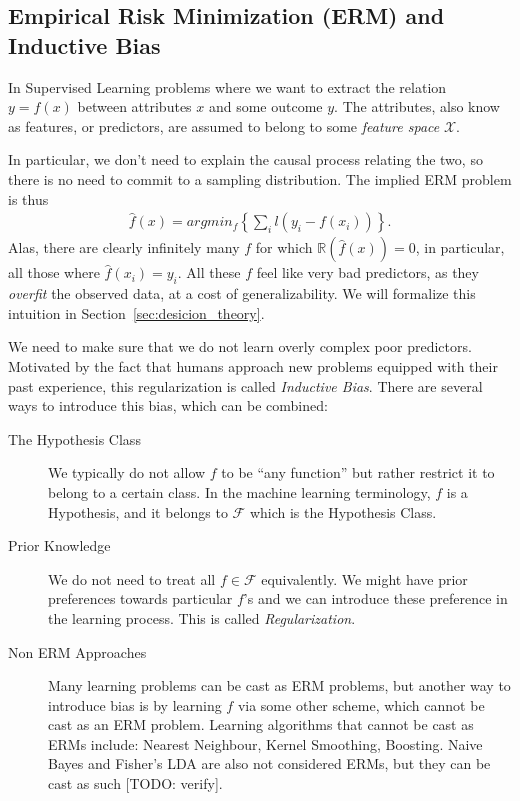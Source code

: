 \documentclass[12pt,a4paper]{article}
\theoremstyle{plain}
\theoremstyle{definition}
\newcommand{\loss}{l}
\newcommand{\riskn}{\mathbb{R}}
\newcommand{\argmin}[2]{argmin_{#1}\left\{ #2 \right\}}
\newcommand{\hyp}{f}
\newcommand{\hypclass}{\mathcal{F}}
\newcommand{\featureS}{\mathcal{X}}
\begin{document}
\subsection{Empirical Risk Minimization (ERM) and Inductive Bias}
In Supervised Learning problems where we want to extract the relation $y=\hyp(x)$ between attributes $x$ and some outcome $y$.
The attributes, also know as features, or predictors, are assumed to belong to some \emph{feature space} $\featureS$. 

In particular, we don't need to explain the causal process relating the two, so there is no need to commit to a sampling distribution. The implied ERM problem is thus
\begin{align}
	\hat{\hyp}(x) = \argmin{\hyp}{\sum_i \loss(y_i - \hyp(x_i))}.
\end{align}
Alas, there are clearly infinitely many $\hyp$ for which $\riskn(\hat{\hyp}(x))=0$, in particular, all those where $\hat{\hyp}(x_i)=y_i$.
All these $\hyp$ feel like very bad predictors, as they \emph{overfit} the observed data, at a cost of generalizability.
We will formalize this intuition in Section~\ref{sec:desicion_theory}. 

We need to make sure that we do not learn overly complex poor predictors. 
Motivated by the fact that humans approach new problems equipped with their past experience, this regularization is called \emph{Inductive Bias}. 
There are several ways to introduce this bias, which can be combined:
\begin{description}
\item[The Hypothesis Class]
We typically do not allow $\hyp$ to be ``any function'' but rather restrict it to belong to a certain class. In the machine learning terminology, $\hyp$ is a Hypothesis, and it belongs to $\hypclass$ which is the Hypothesis Class.
\item[Prior Knowledge] We do not need to treat all $\hyp \in \hypclass$ equivalently. We might have prior preferences towards particular $\hyp$'s and we can introduce these preference in the learning process. This is called \emph{Regularization}.
\item[Non ERM Approaches] Many learning problems can be cast as ERM problems, but another way to introduce bias is by learning $\hyp$ via some other scheme, which cannot be cast as an ERM problem. 
Learning algorithms that cannot be cast as ERMs include: Nearest Neighbour, Kernel Smoothing, Boosting.
Naive Bayes and Fisher's LDA are also not considered ERMs, but they can be cast as such [TODO: verify].
\end{description}
\end{document}
